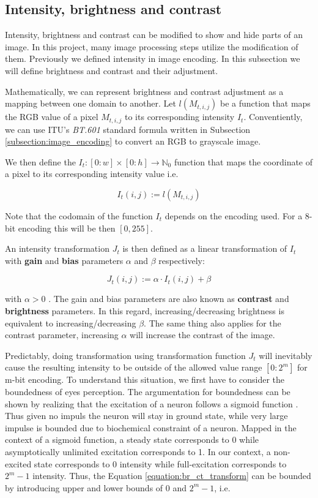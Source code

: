 \documentclass[pdftex,12pt,a4paper]{report}
\begin{document}
\subsection{Intensity, brightness and contrast}
\label{subsection:brightness_contrast_adjustment}

Intensity, brightness and contrast can be modified to show and hide parts of an image. In this project, many image processing steps utilize the modification of them. Previously we defined  intensity in image encoding. In this subsection we will define brightness and contrast and their adjustment.

Mathematically, we can represent brightness and contrast adjustment as a mapping between one domain to another. Let $l(M_{t, i, j})$ be a function that maps the RGB value of a pixel $M_{t, i, j}$ to its corresponding intensity $I_t$. Conventiently, we can use ITU's \textit{BT.601} standard formula written in Subsection \ref{subsection:image_encoding} to convert an RGB to grayscale image.

We then define the $I_t: [0:w] \times [0:h] \rightarrow \mathbb{N}_0$ function that maps the coordinate of a pixel to its corresponding intensity value i.e.

$$
I_t(i, j) := l(M_{t, i, j})
$$

Note that the codomain of the function $I_t$ depends on the encoding used. For a 8-bit encoding this will be then $[0,255]$.

An intensity transformation $J_t$ is then defined as a linear transformation of $I_t$ with \textbf{gain} and \textbf{bias} parameters $\alpha$ and $\beta$ respectively:

\begin{equation}
\label{equation:br_ct_transform}
J_t(i, j) := \alpha \cdot I_t(i, j) + \beta 
\end{equation}

with $\alpha > 0$ \cite{szeliski2010computer}. The gain and bias parameters are also known as \textbf{contrast} and \textbf{brightness} parameters. In this regard, increasing/decreasing brightness is equivalent to increasing/decreasing $\beta$. The same thing also applies for the contrast parameter, increasing $\alpha$ will increase the contrast of the image.

Predictably, doing transformation using transformation function $J_t$ will inevitably cause the resulting intensity to be outside of the allowed value range $[0:2^m]$ for m-bit encoding. To understand this situation, we first have to consider the boundedness of eyes perception. The argumentation for boundedness can be shown by realizing that the excitation of a neuron follows a sigmoid function \cite{gazzaniga2004cognitive}. Thus given no impuls the neuron will stay in ground state, while very large impulse is bounded due to biochemical constraint of a neuron. Mapped in the context of a sigmoid function, a steady state corresponds to 0 while asymptotically unlimited excitation corresponds to 1. In our context, a non-excited state corresponds to 0 intensity while full-excitation corresponds to $2^m - 1$ intensity. Thus, the Equation \ref{equation:br_ct_transform} can be bounded by introducing upper and lower bounds of $0$ and $2^m - 1$, i.e.
\end{document}
